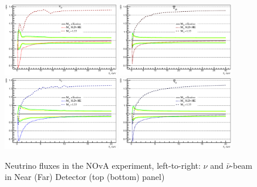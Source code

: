 \begin{figure}[htb!]
\begin{center}
\includegraphics[width=0.45\textwidth]{./NOvA/NOvA_newflux_Scintillator_nm_n5.eps}
\includegraphics[width=0.45\textwidth]{./NOvA/NOvA_newflux_Scintillator_am_n5.eps}
\includegraphics[width=0.45\textwidth]{./NOvA/NOvA_newflux_Scintillator_ne_n5.eps}
\includegraphics[width=0.45\textwidth]{./NOvA/NOvA_newflux_Scintillator_ae_n5.eps}
\caption{\label{NOvArates}Neutrino fluxes in the NOvA experiment, left-to-right: $\nu$ and $\bar\nu$-beam in Near (Far) Detector (top (bottom) panel)}
\end{center}
\end{figure}
